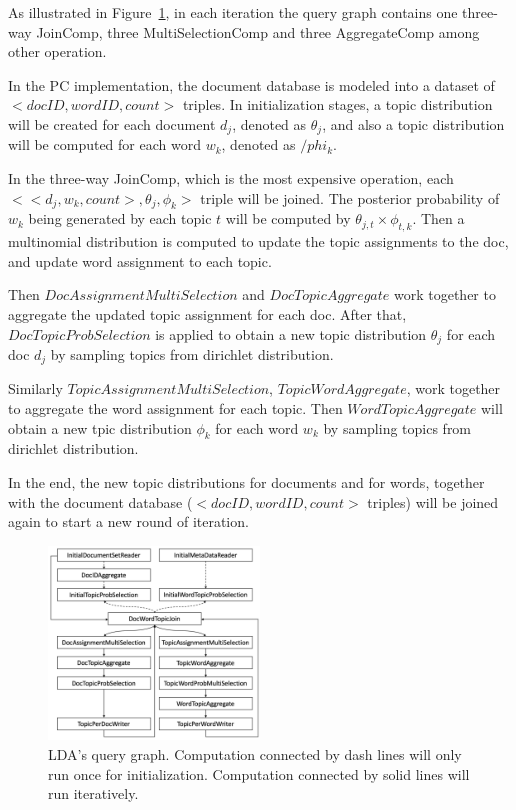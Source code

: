 As illustrated in Figure~\ref{fig:lda-query-graph}, in each iteration the query graph contains
one three-way JoinComp, three MultiSelectionComp and three
AggregateComp among other operation. 


\vspace{5pt}
In the PC implementation, the document database is modeled into a
dataset of $<docID, wordID, count>$ triples. In initialization stages, a
topic distribution will be created for each document $d_j$, denoted as
$\theta_j$, and also a topic
distribution will be computed for each word $w_k$, denoted as $/phi_k$. 

In the three-way JoinComp, which is the
most expensive operation, each $<<d_j, w_k, count>, \theta_j, \phi_k>$
triple will be joined. The posterior probability of $w_k$ being
generated by each topic $t$ will be computed by $\theta_{j,t}\times
\phi_{t,k}$. Then a multinomial distribution is computed to
update the topic assignments to the doc, and update word assignment
to each topic. 

Then $DocAssignmentMultiSelection$ and
$DocTopicAggregate$ work together to aggregate the updated topic
assignment for each doc. After that,
$DocTopicProbSelection$ is applied to obtain a new topic distribution $\theta_j$
for each doc $d_j$ by sampling topics from dirichlet distribution.

Similarly $TopicAssignmentMultiSelection$, $TopicWordAggregate$,
work together to aggregate the word
assignment for each topic. Then $WordTopicAggregate$ will obtain a new
tpic distribution $\phi_k$ for each word $w_k$ by sampling topics from
dirichlet distribution.

In the end, the new topic distributions for documents and for words,
together with the document database ($<docID, wordID, count>$ triples)
will be joined again to start a new round of iteration.




\begin{figure}
\centering
\includegraphics[width=0.5\textwidth]{lda-query-graph.pdf}
  \caption{\label{fig:lda-query-graph} LDA's query graph. Computation
    connected by dash lines will only run once for
    initialization. Computation connected by solid lines will run iteratively.}
\end{figure}


